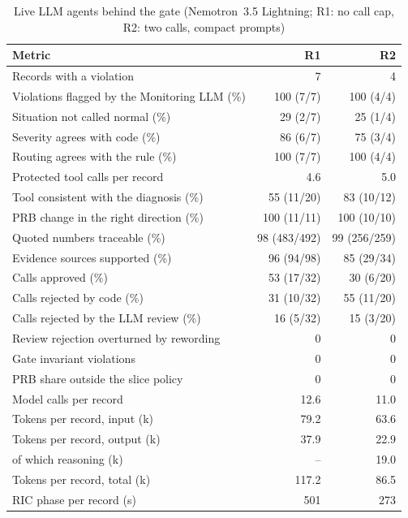 \begin{table}[!t]
\centering
\caption{Live LLM agents behind the gate (Nemotron~3.5 Lightning; R1: no call cap, R2: two calls, compact prompts)}\label{tab:live}
\footnotesize
\setlength{\tabcolsep}{3pt}
\begin{tabular}{@{}lrr@{}}
\toprule
Metric & R1 & R2 \\
\midrule
Records with a violation & 7 & 4 \\
Violations flagged by the Monitoring LLM (\%) & 100 (7/7) & 100 (4/4) \\
Situation not called normal (\%) & 29 (2/7) & 25 (1/4) \\
Severity agrees with code (\%) & 86 (6/7) & 75 (3/4) \\
Routing agrees with the rule (\%) & 100 (7/7) & 100 (4/4) \\
Protected tool calls per record & 4.6 & 5.0 \\
Tool consistent with the diagnosis (\%) & 55 (11/20) & 83 (10/12) \\
PRB change in the right direction (\%) & 100 (11/11) & 100 (10/10) \\
Quoted numbers traceable (\%) & 98 (483/492) & 99 (256/259) \\
Evidence sources supported (\%) & 96 (94/98) & 85 (29/34) \\
Calls approved (\%) & 53 (17/32) & 30 (6/20) \\
Calls rejected by code (\%) & 31 (10/32) & 55 (11/20) \\
Calls rejected by the LLM review (\%) & 16 (5/32) & 15 (3/20) \\
Review rejection overturned by rewording & 0 & 0 \\
Gate invariant violations & 0 & 0 \\
PRB share outside the slice policy & 0 & 0 \\
Model calls per record & 12.6 & 11.0 \\
Tokens per record, input (k) & 79.2 & 63.6 \\
Tokens per record, output (k) & 37.9 & 22.9 \\
\quad of which reasoning (k) & -- & 19.0 \\
Tokens per record, total (k) & 117.2 & 86.5 \\
RIC phase per record (s) & 501 & 273 \\
\bottomrule
\end{tabular}
\end{table}
